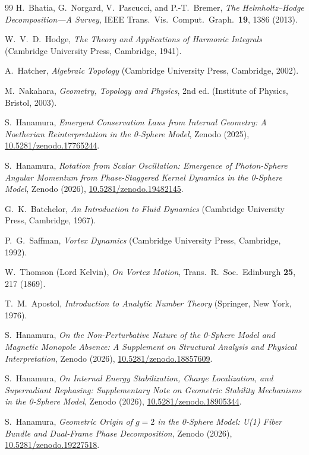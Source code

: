 \documentclass[%
 reprint, amsmath,amssymb, aps, prb, ]{revtex4-2}
\numberwithin{equation}{section}
\begin{document}
\begin{thebibliography}{99}
H.~Bhatia, G.~Norgard, V.~Pascucci, and P.-T.~Bremer,
\emph{The Helmholtz--Hodge Decomposition---A Survey},
IEEE Trans.~Vis.~Comput.~Graph.\ \textbf{19}, 1386 (2013).

W.~V.~D.~Hodge,
\emph{The Theory and Applications of Harmonic Integrals}
(Cambridge University Press, Cambridge, 1941).

A.~Hatcher,
\emph{Algebraic Topology}
(Cambridge University Press, Cambridge, 2002).

M.~Nakahara,
\emph{Geometry, Topology and Physics}, 2nd ed.
(Institute of Physics, Bristol, 2003).

S.~Hanamura,
\emph{Emergent Conservation Laws from Internal Geometry: A Noetherian Reinterpretation in the 0-Sphere Model},
Zenodo (2025), \href{https://doi.org/10.5281/zenodo.17765244}{10.5281/zenodo.17765244}.

S.~Hanamura,
\emph{Rotation from Scalar Oscillation: Emergence of Photon-Sphere Angular Momentum from Phase-Staggered Kernel Dynamics in the 0-Sphere Model},
Zenodo (2026), \href{https://doi.org/10.5281/zenodo.19482145}{10.5281/zenodo.19482145}.

G.~K.~Batchelor,
\emph{An Introduction to Fluid Dynamics}
(Cambridge University Press, Cambridge, 1967).

P.~G.~Saffman,
\emph{Vortex Dynamics}
(Cambridge University Press, Cambridge, 1992).

W.~Thomson (Lord Kelvin),
\emph{On Vortex Motion},
Trans.~R.~Soc.~Edinburgh \textbf{25}, 217 (1869).

T.~M.~Apostol,
\emph{Introduction to Analytic Number Theory}
(Springer, New York, 1976).

S.~Hanamura,
\emph{On the Non-Perturbative Nature of the 0-Sphere Model and Magnetic Monopole Absence: A Supplement on Structural Analysis and Physical Interpretation},
Zenodo (2026), \href{https://doi.org/10.5281/zenodo.18857609}{10.5281/zenodo.18857609}.

S.~Hanamura,
\emph{On Internal Energy Stabilization, Charge Localization, and Superradiant Rephasing: Supplementary Note on Geometric Stability Mechanisms in the 0-Sphere Model},
Zenodo (2026), \href{https://doi.org/10.5281/zenodo.18905344}{10.5281/zenodo.18905344}.

S.~Hanamura,
\emph{Geometric Origin of $g=2$ in the 0-Sphere Model: U(1) Fiber Bundle and Dual-Frame Phase Decomposition},
Zenodo (2026), \href{https://doi.org/10.5281/zenodo.19227518}{10.5281/zenodo.19227518}.


\end{thebibliography}
\end{document}
